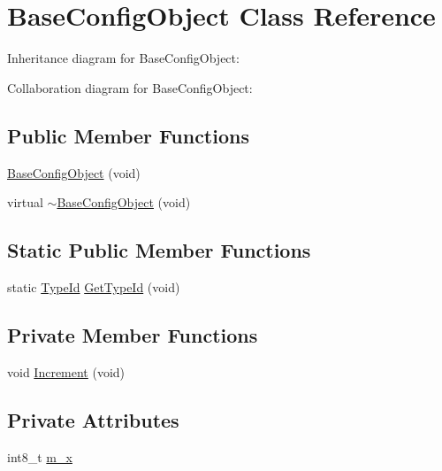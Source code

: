 \hypertarget{classBaseConfigObject}{}\section{Base\+Config\+Object Class Reference}
\label{classBaseConfigObject}


Inheritance diagram for Base\+Config\+Object\+:


Collaboration diagram for Base\+Config\+Object\+:
\subsection*{Public Member Functions}
\begin{DoxyCompactItemize}
\item 
\hyperlink{classBaseConfigObject_a73cab0881d7b7aaf934b53bfffb5a546}{Base\+Config\+Object} (void)
\item 
virtual \hyperlink{classBaseConfigObject_afd7a16ff8c43bf194b5f602b6e0bb880}{$\sim$\+Base\+Config\+Object} (void)
\end{DoxyCompactItemize}
\subsection*{Static Public Member Functions}
\begin{DoxyCompactItemize}
\item 
static \hyperlink{classns3_1_1TypeId}{Type\+Id} \hyperlink{classBaseConfigObject_a5fa358b4dfe439e61b0a2aef6e8c518c}{Get\+Type\+Id} (void)
\end{DoxyCompactItemize}
\subsection*{Private Member Functions}
\begin{DoxyCompactItemize}
\item 
void \hyperlink{classBaseConfigObject_a8df7f4b4250a87ab22028e8a9d87f0a4}{Increment} (void)
\end{DoxyCompactItemize}
\subsection*{Private Attributes}
\begin{DoxyCompactItemize}
\item 
int8\+\_\+t \hyperlink{classBaseConfigObject_af8fce994135a069718981bd147d564b3}{m\+\_\+x}
\end{DoxyCompactItemize}
